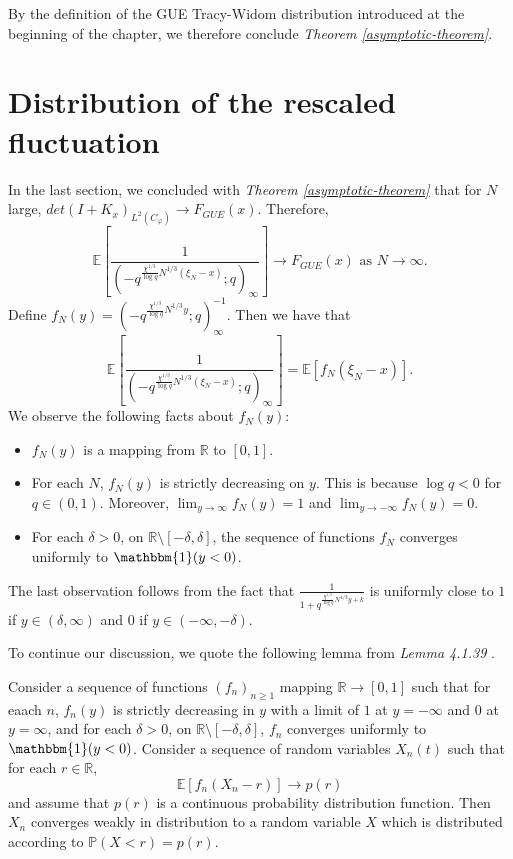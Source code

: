 By the definition of the GUE Tracy-Widom distribution introduced at the beginning of the chapter, we therefore conclude \textit{Theorem \ref{asymptotic-theorem}}.

\section{Distribution of the rescaled fluctuation}
In the last section, we concluded with \textit{Theorem \ref{asymptotic-theorem}} that for $N$ large, $det(I+K_x)_{L^2(C_{\varphi})} \rightarrow F_{GUE}(x)$. Therefore, 
\begin{equation}
\label{finale-equality}
\mathbb{E} \left[ \frac{1}{( -q^{ \frac{\chi^{1/3}}{\log q} N^{1/3} (\xi_N - x) }; q )_{\infty}} \right] \rightarrow F_{GUE}(x) \text{ as } N \rightarrow \infty.
\end{equation}
Define $f_N(y) = (-q^{\frac{\chi^{1/3}}{\log q} N^{1/3} y};q)_{\infty}^{-1}.$ Then we have that $$\mathbb{E} \left[ \frac{1}{( -q^{ \frac{\chi^{1/3}}{\log q} N^{1/3} (\xi_N - x) }; q )_{\infty}} \right] = \mathbb{E} \left[ f_N(\xi_N - x) \right].$$ We observe the following facts about $f_N(y)$:
\begin{itemize}
\item $f_N(y)$ is a mapping from $\mathbb{R}$ to $[0,1]$.
\item For each $N$, $f_N(y)$ is strictly decreasing on $y$. This is because $\log q < 0$ for $q \in (0,1)$. Moreover, $\lim_{y \rightarrow \infty} f_N(y) = 1$ and $\lim_{y \rightarrow -\infty} f_N(y) = 0$.
\item For each $\delta > 0$, on $\mathbb{R} \setminus [-\delta, \delta]$, the sequence of functions $f_N$ converges uniformly to $\mathbbm{1}(y < 0)$.
\end{itemize}
The last observation follows from the fact that $\frac{1}{1+q^{\frac{\chi^{1/3}}{\log q} N^{1/3} y + k}}$ is uniformly close to $1$ if $y \in (\delta, \infty)$ and $0$ if $y \in (-\infty, -\delta)$.

To continue our discussion, we quote the following lemma from \textit{\cite{macdonald2014} Lemma 4.1.39 }. 
\begin{lemma}
\label{last-lemma}
Consider a sequence of functions $(f_n)_{n \ge 1}$ mapping $\mathbb{R} \rightarrow [0,1]$ such that for eaach $n$, $f_n(y)$ is strictly decreasing in $y$ with a limit of $1$ at $y = -\infty$ and $0$ at $y = \infty$, and for each $\delta > 0$, on $\mathbb{R} \setminus [-\delta, \delta]$, $f_n$ converges uniformly to $\mathbbm{1}(y < 0)$. Consider a sequence of random variables $X_n(t)$ such that for each $r \in \mathbb{R}$, $$\mathbb{E} [f_n(X_n - r)] \rightarrow p(r)$$ and assume that $p(r)$ is a continuous probability distribution function. Then $X_n$ converges weakly in distribution to a random variable $X$ which is distributed according to $\mathbb{P}(X < r) = p(r)$.
\end{lemma}

